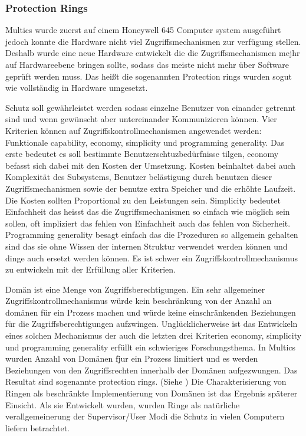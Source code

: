 \documentclass[9pt,technote]{IEEEtran}
\begin{document}
  \subsubsection{Protection Rings} \label{subsubsec:protectrings}
    Multics wurde zuerst auf einem Honeywell 645 Computer system ausgef\"uhrt jedoch konnte die Hardware nicht viel Zugriffsmechanismen zur verf\"ugung stellen.
    Deshalb wurde eine neue Hardware entwickelt die die Zugriffsmechanismen mejhr auf Hardwareebene bringen sollte, sodass das meiste nicht mehr \"uber Software
    gepr\"uft werden muss. Das hei\ss t die sogenannten Protection rings wurden sogut wie vollst\"andig in Hardware umgesetzt. \cite{inproc:protec-rings}
    
  
    Schutz soll gew\"ahrleistet werden sodass einzelne Benutzer von einander getrennt sind und wenn gew\"unscht aber untereinander Kommunizieren k\"onnen.
    Vier Kriterien k\"onnen auf Zugriffskontrollmechanismen angewendet werden: Funktionale capability, economy, simplicity und programming generality.
    Das erste bedeutet es soll bestimmte Benutzerschtuzbed\"urfnisse tilgen, economy befasst sich dabei mit den Kosten der Umsetzung.
    Kosten beinhaltet dabei auch Komplexit\"at des Subsystems, Benutzer bel\"astigung durch benutzen dieser Zugriffsmechanismen sowie der benutze
    extra Speicher und die erh\"ohte Laufzeit. Die Kosten sollten Proportional zu den Leistungen sein.
    Simplicity bedeutet Einfachheit das heisst das die Zugriffsmechanismen so einfach wie m\"oglich sein sollen, oft
    impliziert das fehlen von Einfachheit auch das fehlen von Sicherheit. Programming generality besagt einfach das die Prozeduren so allgemein gehalten sind
    das sie ohne Wissen der internen Struktur verwendet werden k\"onnen und dinge auch ersetzt werden k\"onnen.
    Es ist schwer ein Zugriffskontrollmechanismus zu entwickeln mit der Erf\"ullung aller Kriterien.
    
    Dom\"an ist eine Menge von Zugriffsberechtigungen. Ein sehr allgemeiner Zugriffskontrollmechanismus w\"urde kein beschr\"ankung von der Anzahl an
    dom\"anen f\"ur ein Prozess machen und w\"urde keine einschr\"ankenden Beziehungen f\"ur die Zugriffsberechtigungen aufzwingen.
    Ungl\"ucklicherweise ist das Entwickeln eines solchen Mechanismus der auch die letzten drei Kriterien economy, simplicity und programming generality
    erf\"ullt ein schwieriges Forschungsthema.  In Multics wurden Anzahl von Dom\"anen f\"jur ein Prozess limitiert und es werden Beziehungen von den Zugriffsrechten innerhalb
    der Dom\"anen aufgezwungen. Das Resultat sind sogenannte protection rings. (Siehe \cite[S. 160]{inproc:protec-rings}) 
    Die Charakterisierung von Ringen als beschr\"ankte Implementierung von Dom\"anen ist das Ergebnis sp\"aterer Einsicht. 
    Als sie Entwickelt wurden, wurden Ringe als nat\"urliche verallgemeinerung der Supervisor/User Modi die Schutz in vielen Computern liefern betrachtet.
    
\end{document}
